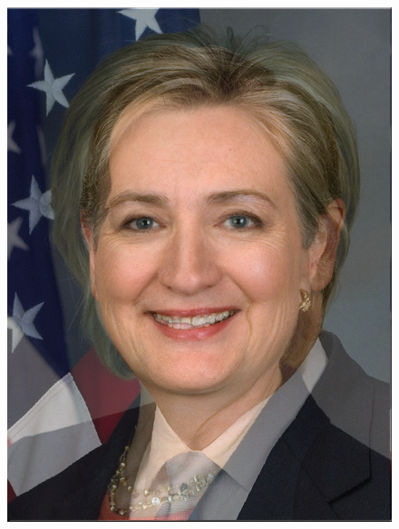 \documentclass[a4paper]{article}
\begin{document}
\begin{figure}[htp]
{\begin{minipage}[b]{0.31\columnwidth}
{\includegraphics[width=1\columnwidth]{CH.png} 
}
\label{fig:3-3:b}
\end{minipage}
}
\hfil
{}
\end{figure}
\end{document}
